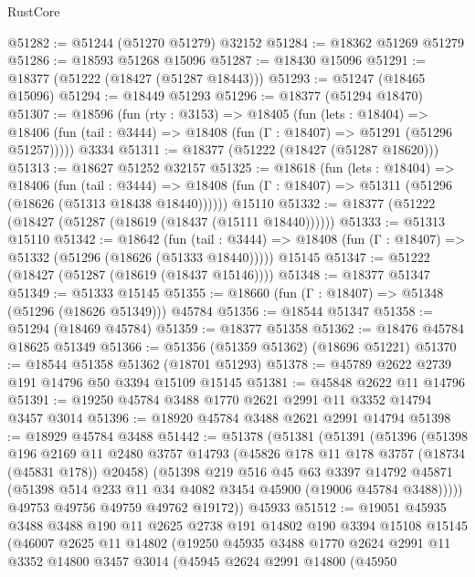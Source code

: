 \begin{lexlean}{RustCore}
\begin{coremodule}
@51282 := @51244 (@51270 @51279) @32152
@51284 := @18362 @51269 @51279
@51286 := @18593 @51268 @15096
@51287 := @18430 @15096
@51291 := @18377 (@51222 (@18427 (@51287 @18443)))
@51293 := @51247 (@18465 @15096)
@51294 := @18449 @51293
@51296 := @18377 (@51294 @18470)
@51307 := @18596
    (fun (rty : @3153) =>
    @18405
      (fun (lets : @18404) =>
      @18406 (fun (tail : @3444) => @18408 (fun (Γ : @18407) => @51291 (@51296 @51257)))))
    @3334
@51311 := @18377 (@51222 (@18427 (@51287 @18620)))
@51313 := @18627 @51252 @32157
@51325 := @18618
    (fun (lets : @18404) =>
    @18406
      (fun (tail : @3444) =>
      @18408 (fun (Γ : @18407) => @51311 (@51296 (@18626 (@51313 @18438 @18440))))))
    @15110
@51332 := @18377 (@51222 (@18427 (@51287 (@18619 (@18437 (@15111 @18440))))))
@51333 := @51313 @15110
@51342 := @18642
    (fun (tail : @3444) => @18408 (fun (Γ : @18407) => @51332 (@51296 (@18626 (@51333 @18440)))))
    @15145
@51347 := @51222 (@18427 (@51287 (@18619 (@18437 @15146))))
@51348 := @18377 @51347
@51349 := @51333 @15145
@51355 := @18660 (fun (Γ : @18407) => @51348 (@51296 (@18626 @51349))) @45784
@51356 := @18544 @51347
@51358 := @51294 (@18469 @45784)
@51359 := @18377 @51358
@51362 := @18476 @45784 @18625 @51349
@51366 := @51356 (@51359 @51362) (@18696 @51221)
@51370 := @18544 @51358 @51362 (@18701 @51293)
@51378 := @45789 @2622 @2739 @191 @14796 @50 @3394 @15109 @15145
@51381 := @45848 @2622 @11 @14796
@51391 := @19250 @45784 @3488 @1770 @2621 @2991 @11 @3352 @14794 @3457 @3014
@51396 := @18920 @45784 @3488 @2621 @2991 @14794
@51398 := @18929 @45784 @3488
@51442 := @51378
    (@51381
      (@51391
        (@51396
          (@51398
            @196
            @2169
            @11
            @2480
            @3757
            @14793
            (@45826 @178 @11 @178 @3757 (@18734 (@45831 @178)) @20458)
            (@51398
              @219
              @516
              @45
              @63
              @3397
              @14792
              @45871
              (@51398 @514 @233 @11 @34 @4082 @3454 @45900 (@19006 @45784 @3488)))))
        @49753
        @49756
        @49759
        @49762
        @19172))
    @45933
@51512 := @19051
    @45935
    @3488
    @3488
    @190
    @11
    @2625
    @2738
    @191
    @14802
    @190
    @3394
    @15108
    @15145
    (@46007
      @2625
      @11
      @14802
      (@19250
        @45935
        @3488
        @1770
        @2624
        @2991
        @11
        @3352
        @14800
        @3457
        @3014
        (@45945
          @2624
          @2991
          @14800
          (@45950

\end{coremodule}
\end{lexlean}
